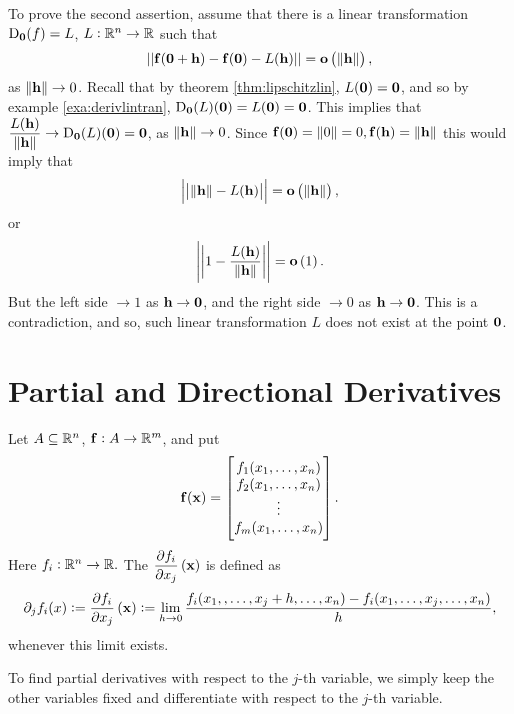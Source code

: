 \begin{multicols}{2}
\begin{problem}
\begin{answer}
      To prove the second assertion, assume that there is a linear
transformation $\deriv{0}{f} = L$,   $L:\reals^n \rightarrow \reals$
such that
$$||\funvect{f}(\vector{0} + \vector{h}) - \funvect{f}(\vector{0}) - L(\vector{h})|| = \smallosans{\norm{\vector{h}}},$$as $\norm{\vector{h}}\rightarrow
0$.  Recall that by theorem \ref{thm:lipschitzlin}, $L(\vector{0}) =
\vector{0}$, and so by example \ref{exa:derivlintran},
$\deriv{0}{L}(\vector{0}) = L(\vector{0}) = \vector{0}$. This
implies that $\dis{\dfrac{L(\vector{h})}{\norm{\vector{h}}}}
\rightarrow \deriv{0}{L}(\vector{0}) = \vector{0}$, as
$\norm{\vector{h}}\rightarrow 0$. Since $\funvect{f}(\vector{0}) = \norm{0} =
0, \funvect{f}(\vector{h}) = \norm{\vector{h}}$ this would imply that
$$\left|\left|\norm{\vector{h}} - L(\vector{h})\right|\right| = \smallosans{\norm{\vector{h}}},$$or
$$\left|\left| 1 -  \dfrac{L(\vector{h})}{\norm{\vector{h}}}\right|\right| = \smallosans{1}.$$
But the left side $\rightarrow 1$ as $\vector{h} \rightarrow
\vector{0}$, and the right side $\rightarrow 0$ as $\vector{h}
\rightarrow \vector{0}$. This is a contradiction, and so, such
linear transformation $L$ does not exist at the point $\vector{0}$.
\end{answer}
\end{problem}
\end{multicols}


\section{Partial and Directional Derivatives}


\begin{df}
Let $A \subseteq \reals^n$,  $\funvect{f}:A \rightarrow \reals^m$, and put
$$\funvect{f}(\point{x}) = \colvec{f_1(x_1,  \ldots, x_n) \\ f_2(x_1,  \ldots, x_n) \\ \vdots \\
f_m(x_1,  \ldots, x_n)}.$$ Here $f_i:\reals^n \rightarrow
\reals.$ The  $\partiald{j}{f_i}{x}$ is
defined as
$$ \partial_j f_i(x):=\partiald{j}{f_i}{x} := \lim _{h \rightarrow 0} \dfrac{f_i(x_1,, \ldots, x_j + h, \ldots, x_n)
- f_i(x_1, \ldots, x_j, \ldots,  x_n)}{h}, $$whenever this
limit exists.
\end{df}

To find partial derivatives with respect to the $j$-th variable,
we simply keep the other variables fixed and differentiate with
respect to the $j$-th variable.


